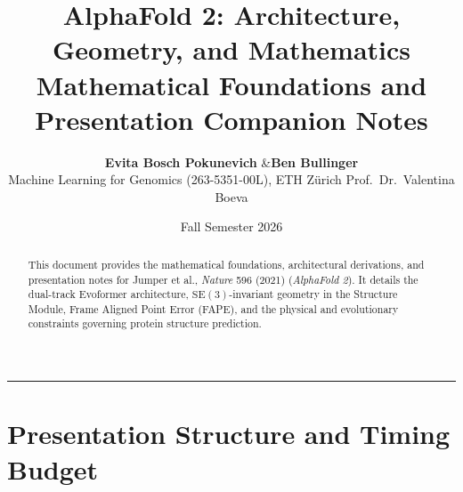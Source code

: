 \documentclass[10pt,a4paper]{article}
\title{\vspace{-8mm}\bfseries\LARGE AlphaFold 2: Architecture, Geometry, and Mathematics\\[2mm]
\large Mathematical Foundations and Presentation Companion Notes}
\author{\textbf{Evita Bosch Pokunevich} \quad\&\quad \textbf{Ben Bullinger}\\[1mm]
\small Machine Learning for Genomics (263-5351-00L), ETH Z\"urich \quad\textbullet\quad Prof.~Dr.~Valentina Boeva}
\date{Fall Semester 2026}
\begin{document}
\maketitle

\vspace{-2mm}
\begin{abstract}
\noindent This document provides the mathematical foundations, architectural derivations, and presentation notes for Jumper et al., \textit{Nature} 596 (2021) (\textit{AlphaFold 2}). It details the dual-track Evoformer architecture, $\mathrm{SE}(3)$-invariant geometry in the Structure Module, Frame Aligned Point Error (FAPE), and the physical and evolutionary constraints governing protein structure prediction.
\end{abstract}

\tableofcontents
\vspace{4mm}
\hrule
\vspace{4mm}

\section{Presentation Structure and Timing Budget}
\end{document}
